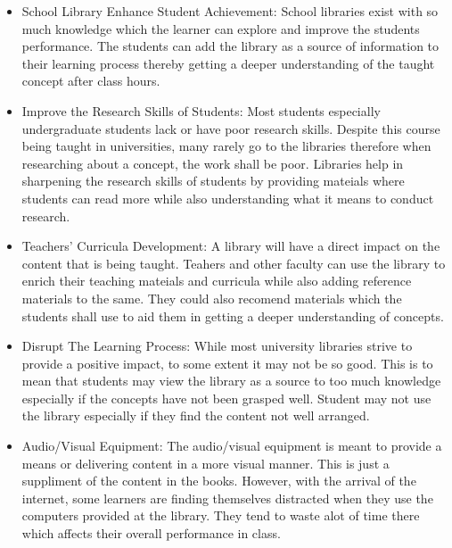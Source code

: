 \documentclass[12pt, a4]{article}
\begin{document}
\begin{itemize}
  
\item{School Library Enhance Student Achievement: School libraries exist with
    so much knowledge which the learner can explore and improve the students
    performance. The students can add the library as a source of information to
    their learning process thereby getting a deeper understanding of the taught
    concept after class hours.}

\item{Improve the Research Skills of Students: Most students especially
    undergraduate students lack or have poor research skills. Despite this
    course being taught in universities, many rarely go to the libraries
    therefore when researching about a concept, the work shall be poor.
    Libraries help in sharpening the research skills of students by providing
    mateials where students can read more while also understanding what it means
    to conduct research.}

\item{Teachers' Curricula Development: A library will have a direct impact on the
    content that is being taught. Teahers and other faculty can use the library
    to enrich their teaching mateials and curricula while also adding reference
    materials to the same. They could also recomend materials which the students
    shall use to aid them in getting a deeper understanding of concepts.}

\item{Disrupt The Learning Process: While most university libraries strive to
    provide a positive impact, to some extent it may not be so good. This is to
    mean that students may view the library as a source to too much knowledge
    especially if the concepts have not been grasped well. Student may not use
    the library especially if they find the content not well arranged.}

\item{Audio/Visual Equipment: The audio/visual equipment is meant to provide a
    means or delivering content in a more visual manner. This is just a
    suppliment of the content in the books. However, with the arrival of
    the internet, some learners are finding themselves distracted when they use the
    computers provided at the library. They tend to waste alot of time there
    which affects their overall performance in class.}

\end{itemize}
\pagebreak
\end{document}

